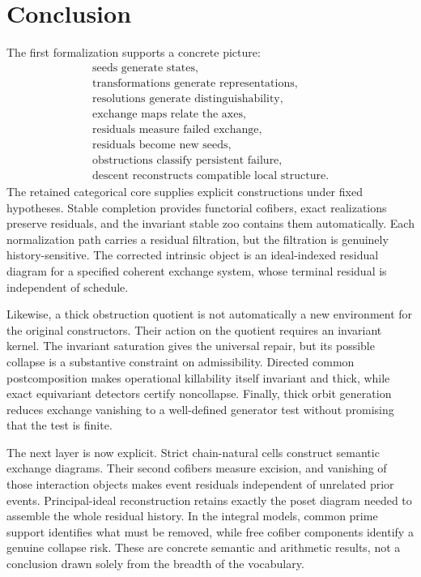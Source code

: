 \documentclass[11pt]{article}
\theoremstyle{definition}
\theoremstyle{remark}
\begin{document}
\section{Conclusion}

The first formalization supports a concrete picture:
\[
\boxed{
\begin{array}{c}
\text{seeds generate states},\\
\text{transformations generate representations},\\
\text{resolutions generate distinguishability},\\
\text{exchange maps relate the axes},\\
\text{residuals measure failed exchange},\\
\text{residuals become new seeds},\\
\text{obstructions classify persistent failure},\\
\text{descent reconstructs compatible local structure}.
\end{array}
}
\]
The retained categorical core supplies explicit constructions under fixed hypotheses. Stable completion provides functorial cofibers, exact realizations preserve residuals, and the invariant stable zoo contains them automatically. Each normalization path carries a residual filtration, but the filtration is genuinely history-sensitive. The corrected intrinsic object is an ideal-indexed residual diagram for a specified coherent exchange system, whose terminal residual is independent of schedule.

Likewise, a thick obstruction quotient is not automatically a new environment for the original constructors. Their action on the quotient requires an invariant kernel. The invariant saturation gives the universal repair, but its possible collapse is a substantive constraint on admissibility. Directed common postcomposition makes operational killability itself invariant and thick, while exact equivariant detectors certify noncollapse. Finally, thick orbit generation reduces exchange vanishing to a well-defined generator test without promising that the test is finite.

The next layer is now explicit. Strict chain-natural cells construct semantic exchange diagrams. Their second cofibers measure excision, and vanishing of those interaction objects makes event residuals independent of unrelated prior events. Principal-ideal reconstruction retains exactly the poset diagram needed to assemble the whole residual history. In the integral models, common prime support identifies what must be removed, while free cofiber components identify a genuine collapse risk. These are concrete semantic and arithmetic results, not a conclusion drawn solely from the breadth of the vocabulary.
\end{document}
